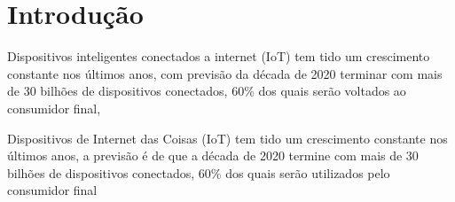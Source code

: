 \chapter{Introdução} 

Dispositivos inteligentes conectados a internet (IoT) tem tido um crescimento constante nos últimos anos, com previsão da década de 2020
terminar com mais de 30 bilhões de dispositivos conectados, 60\% dos quais serão voltados ao consumidor final\cite{statista-iot-connected-devices},


Dispositivos de Internet das Coisas (IoT) tem tido um crescimento constante nos últimos anos, a previsão é de que a década de 2020 termine
com mais de 30 bilhões de dispositivos conectados, 60\% dos quais serão utilizados pelo consumidor final





